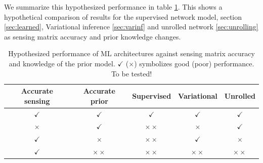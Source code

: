 \documentclass[12pt]{article}
\begin{document}
We summarize this hypothesized performance in table \ref{table:comparison}. This shows a hypothetical comparison of results for the supervised network model, section \ref{sec:learned}, Variational inference \ref{sec:varinf} and unrolled network \ref{sec:unrolling}  as sensing matrix accuracy and prior knowledge changes.
\begin{table}[h]
\centering
\begin{tabular}{| c | c || c | c | c |}
\hline
Accurate sensing & Accurate prior & Supervised & Variational & Unrolled \\ \hline
$\checkmark$ & $\checkmark$ & $\checkmark$ &  $\checkmark$ & $\checkmark$  \\
$\times$ & $\checkmark$ & $\times\times$ & $\times$ & $\checkmark$   \\
$\checkmark$  & $\times$ & $\times\times$ & $\checkmark$ & $\times$  \\
$\checkmark$  & $\times\times$ & $\times\times$ & $\times\times$ & $\times\times$ \\
\hline
\end{tabular}
\caption{Hypothesized performance of ML architectures against sensing matrix accuracy and knowledge of the prior model. $\checkmark$ ($\times$) symbolizes good (poor) performance. To be tested!}\label{table:comparison}
\end{table}
\end{document}
